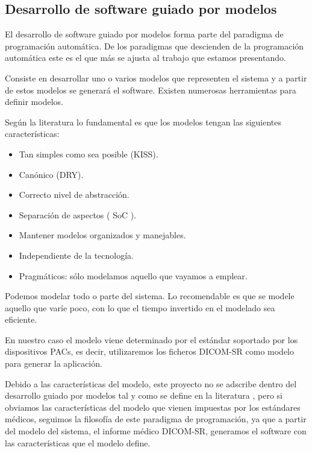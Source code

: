 \subsection{Desarrollo de software guiado por modelos}
El desarrollo de software guiado por modelos forma parte del paradigma de programación automática. De los paradigmas que descienden de la programación automática este es el que más se ajusta al trabajo que estamos presentando.\par
Consiste en desarrollar uno o varios modelos que representen el sistema y a partir de estos modelos se generará el software. Existen numerosas herramientas para definir modelos.\par
Según la literatura \cite{MDA} lo fundamental es que los modelos tengan las siguientes características:
\begin{itemize}
	\item Tan simples como sea posible (KISS).
	\item Canónico (DRY).
	\item Correcto nivel de abstracción.
	\item Separación de aspectos ( SoC ).
	\item Mantener modelos organizados y manejables.
	\item Independiente de la tecnología.
	\item Pragmáticos: sólo modelamos aquello que vayamos a emplear.
\end{itemize}
Podemos modelar todo o parte del sistema. Lo recomendable es que se modele aquello que varíe poco, con lo que el tiempo invertido en el modelado sea eficiente.\medskip \par

En nuestro caso el modelo viene determinado por el estándar soportado por los dispositivos PACs, es decir, utilizaremos los ficheros DICOM-SR como modelo para generar la aplicación.\par
Debido a las características del modelo, este proyecto no se adscribe dentro del desarrollo guiado por modelos tal y como se define en la literatura \cite{mdd}, pero si obviamos las características del modelo que vienen impuestas por los estándares médicos, seguimos la filosofía de este paradigma de programación, ya que a partir del modelo del sistema, el informe médico DICOM-SR, generamos el software con las características que el modelo define.\par


